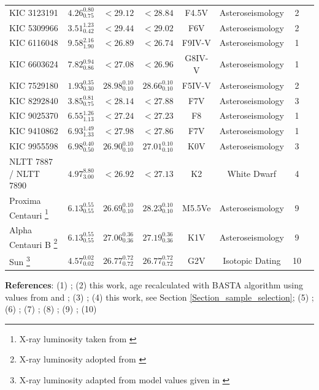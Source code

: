 \begin{appendices}
\begin{table}[htbp]
{\begin{minipage}{\textheight}
{\begin{tabular}{lccccccc}
				KIC 3123191 & $4.26^{0.80}_{0.75}$ & $<29.12$ & $<28.84$ & F4.5V & Asteroseismology & 2 \\
				KIC 5309966 & $3.51^{1.23}_{0.42}$ & $<29.44$ & $<29.02$ & F6V & Asteroseismology & 2 \\
				KIC 6116048 & $9.58^{2.16}_{1.90}$ & $<26.89$ & $<26.74$ & F9IV-V & Asteroseismology & 1 \\
				KIC 6603624 & $7.82^{0.94}_{0.86}$ & $<27.08$ & $<26.96$ & G8IV-V & Asteroseismology & 1 \\
				KIC 7529180 & $1.93^{0.35}_{0.30}$ & $28.98^{0.10}_{0.10}$ & $28.66^{0.10}_{0.10}$ & F5IV-V & Asteroseismology & 2 \\
				KIC 8292840 & $3.85^{0.81}_{0.75}$ & $<28.14$ & $<27.88$ & F7V & Asteroseismology & 3 \\
				KIC 9025370 & $6.55^{1.26}_{1.13}$ & $<27.24$ & $<27.23$ & F8 & Asteroseismology & 1 \\
				KIC 9410862 & $6.93^{1.49}_{1.33}$ & $<27.98$ & $<27.86$ & F7V & Asteroseismology & 1 \\
				KIC 9955598 & $6.98^{0.40}_{0.50}$ & $26.90^{0.10}_{0.10}$ & $27.01^{0.10}_{0.10}$ & K0V & Asteroseismology & 3 \\
				NLTT 7887 / NLTT 7890 & $4.97^{8.80}_{3.00}$ & $<26.92$ & $<27.13$ & K2 & White Dwarf & 4 \\
				Proxima Centauri  \footnote{X-ray luminosity taken from \citet{Fuhrmeister_etal_2011}} & $6.13^{0.55}_{0.55}$ & $26.69^{0.10}_{0.10}$ & $28.23^{0.10}_{0.10}$ & M5.5Ve & Asteroseismology & 9 \\
				Alpha Centauri B \footnote{X-ray luminosity adopted from \citet{Robrade_etal_2012}} & $6.13^{0.55}_{0.55}$ & $27.06^{0.36}_{0.36}$ & $27.19^{0.36}_{0.36}$ & K1V & Asteroseismology & 9 \\
				Sun \footnote{X-ray luminosity adapted from model values given in \citet{Peres_etal_2000}} & $4.57^{0.02}_{0.02}$ & $26.77^{0.72}_{0.72}$ & $26.77^{0.72}_{0.72}$ & G2V & Isotopic Dating & 10 \\
				\hline  
     
			\end{tabular}}
        \begin{footnotesize}		
		\noindent \textbf{References}: (1) \citet{Silva_Aguirre_etal_2017}; (2) this work, age recalculated with BASTA algorithm \citep{Silva_Aguirre_etal_2015} using values from \citet{Chaplin_etal_2014} and  \citet{Buchhave_Latham_2015}; (3) \citet{Silva_Aguirre_etal_2015}; (4) this work, see Section \ref{Section_sample_selection}; (5) \citet{Kervella_etal_2008}; (6) \citet{Feltzing_Holmberg_2000}; (7) \citet{Anglada_Escude_etal_2014}; (8) \citet{DeWarf_etal_2010}; (9) \citet{Miglio_Montalban_2005}; (10) \citet{Bahcall_etal_1995}
		

\end{footnotesize}
\end{minipage}}
\end{table}
\end{appendices}
